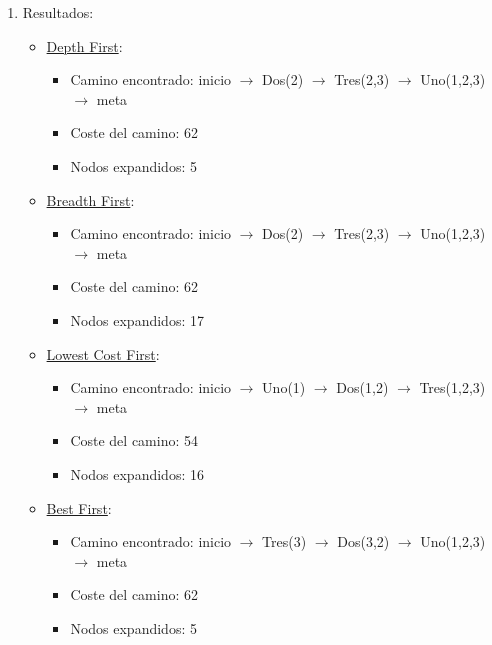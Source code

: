 \documentclass{article}
\begin{document}
\begin{enumerate}
    \item
        Resultados:

        \begin{itemize}
            \item \underline{Depth First}:
                \begin{itemize}
                    \item Camino encontrado: inicio $\rightarrow$ Dos(2) $\rightarrow$ Tres(2,3) $\rightarrow$ Uno(1,2,3) $\rightarrow$ meta
                    \item Coste del camino: 62
                    \item Nodos expandidos: 5
                \end{itemize}
            \smallskip
            \item \underline{Breadth First}:
                \begin{itemize}
                    \item Camino encontrado: inicio $\rightarrow$ Dos(2) $\rightarrow$ Tres(2,3) $\rightarrow$ Uno(1,2,3) $\rightarrow$ meta
                    \item Coste del camino: 62
                    \item Nodos expandidos: 17
                \end{itemize}
            \smallskip
            \item \underline{Lowest Cost First}:
                \begin{itemize}
                    \item Camino encontrado: inicio $\rightarrow$ Uno(1) $\rightarrow$ Dos(1,2) $\rightarrow$ Tres(1,2,3) $\rightarrow$ meta
                    \item Coste del camino: 54
                    \item Nodos expandidos: 16
                \end{itemize}
            \smallskip
            \newpage
            \item \underline{Best First}:
                \begin{itemize}
                    \item Camino encontrado: inicio $\rightarrow$ Tres(3) $\rightarrow$ Dos(3,2) $\rightarrow$ Uno(1,2,3) $\rightarrow$ meta
                    \item Coste del camino: 62
                    \item Nodos expandidos: 5
                \end{itemize}
            \smallskip

\end{itemize}
\end{enumerate}
\end{document}
